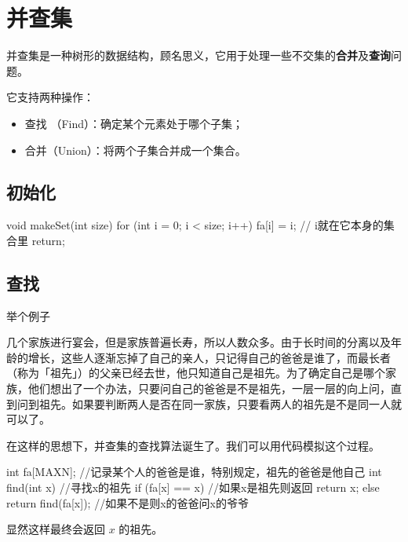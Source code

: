
\section{并查集}

并查集是一种树形的数据结构，顾名思义，它用于处理一些不交集的\textbf{合并}及\textbf{查询}问题。  

它支持两种操作：

\begin{itemize}
\item 查找 （Find）：确定某个元素处于哪个子集；
\item 合并（Union）：将两个子集合并成一个集合。
\end{itemize}

\subsection{初始化}

\begin{cppcode}
void makeSet(int size) {
  for (int i = 0; i < size; i++) {
    fa[i] = i;  // i就在它本身的集合里
  }
  return;
}
\end{cppcode}

\subsection{查找}

\begin{NOTE}{举个例子}{}

\end{NOTE}


几个家族进行宴会，但是家族普遍长寿，所以人数众多。由于长时间的分离以及年龄的增长，这些人逐渐忘掉了自己的亲人，只记得自己的爸爸是谁了，而最长者（称为「祖先」）的父亲已经去世，他只知道自己是祖先。为了确定自己是哪个家族，他们想出了一个办法，只要问自己的爸爸是不是祖先，一层一层的向上问，直到问到祖先。如果要判断两人是否在同一家族，只要看两人的祖先是不是同一人就可以了。  

在这样的思想下，并查集的查找算法诞生了。我们可以用代码模拟这个过程。

\begin{cppcode}
int fa[MAXN];  //记录某个人的爸爸是谁，特别规定，祖先的爸爸是他自己
int find(int x)  //寻找x的祖先
{
  if (fa[x] == x)  //如果x是祖先则返回
    return x;
  else
    return find(fa[x]);  //如果不是则x的爸爸问x的爷爷
}
\end{cppcode}

显然这样最终会返回 $x$ 的祖先。

